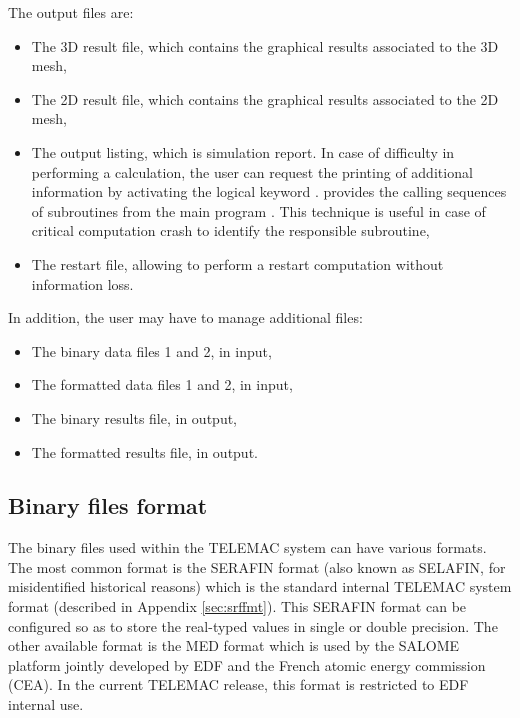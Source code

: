 The output files are:

\begin{itemize}
\item The 3D result file, which contains the graphical results associated to
the 3D mesh,

\item The 2D result file, which contains the graphical results associated to
the 2D mesh,

\item The output listing, which is simulation report. In case of difficulty in
performing a calculation, the user can request the printing of additional
information by activating the logical keyword .
 provides the calling sequences of subroutines from the
main program . This technique is useful in case of
critical computation crash to identify the responsible subroutine,

%
\item The restart file, allowing to perform a restart computation without
information loss.
\end{itemize}

In addition, the user may have to manage additional files:

\begin{itemize}
\item The binary data files 1 and 2, in input,

\item The formatted data files 1 and 2, in input,

\item The binary results file, in output,

\item The formatted results file, in output.
\end{itemize}


\subsection{Binary files format}
\label{sec:binfile}
The binary files used within the TELEMAC system can have various formats. The
most common format is the SERAFIN format (also known as SELAFIN, for
misidentified historical reasons) which is the standard internal TELEMAC system
format (described in Appendix \ref{sec:srffmt}). This SERAFIN format can be
configured so as to store the real-typed values in single or double precision.
The other available format is the MED format which is used by the SALOME
platform jointly developed by EDF and the French atomic energy commission
(CEA). In the current TELEMAC release, this format is restricted to EDF
internal use.


